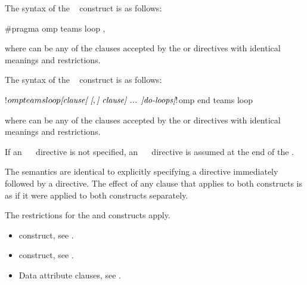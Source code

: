 \syntax
\begin{ccppspecific}
The syntax of the ~ construct is as follows:

\begin{ompcPragma}
#pragma omp teams loop \plc{[clause[ [},\plc{] clause] ... ] new-line}
\end{ompcPragma}

where  can be any of the clauses accepted by the  or
   directives with identical meanings and restrictions.
\end{ccppspecific}

\begin{fortranspecific}
The syntax of the ~ construct is as follows:

\begin{ompfPragma}
!$omp teams loop \plc{[clause[ [},\plc{] clause] ... ]}
    \plc{do-loops}
\plc{[}!$omp end teams loop\plc{]}
\end{ompfPragma}

where  can be any of the clauses accepted by the  or
directives with identical meanings and restrictions.

If an ~~ directive is not specified, an
~~ directive is assumed at the end of the .
\end{fortranspecific}

\descr
The semantics are identical to explicitly specifying a  directive immediately
followed by a  directive. The effect of any clause that applies to both constructs is as if it were applied to both constructs separately.


\restrictions
The restrictions for the  and  constructs apply.

\crossreferences
\begin{itemize}
\item {} construct, see
.

\item {} construct, see
.

\item Data attribute clauses, see
.
\end{itemize}












